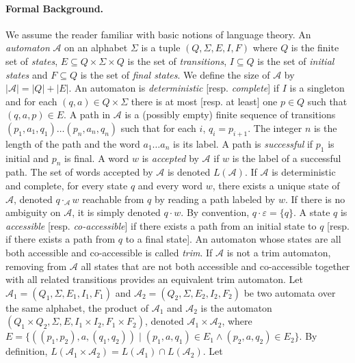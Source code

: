 \documentclass[]{llncs}
\def \A {\mathcal{A}}
\begin{document}
\paragraph*{Formal Background.}
We assume the reader familiar with basic notions of language theory.
An {\it automaton} $\A$ on an alphabet $\Sigma$ is a tuple
$(Q,\Sigma,E,I,F)$ where $Q$ is the finite set of {\it states}, $E\subseteq
Q\times \Sigma\times Q$ is the set of {\it transitions}, $I\subseteq Q$ is
the set of {\it initial states} and $F\subseteq Q$ is the set of {\it final
  states}. We define the size of $\A$ by $|\A| = |Q| + |E|$. An automaton is
{\it deterministic} [resp. {\it complete}] if $I$ is a singleton and for
each $(q,a)\in Q\times \Sigma$ there is at most [resp. at least] one $p\in
Q$ such that $(q,a,p)\in E$. A path in $\A$ is a (possibly empty) finite
sequence of transitions $(p_1,a_1,q_1)\ldots (p_n,a_n,q_n)$ such that for
each $i$, $q_i=p_{i+1}$. The integer $n$ is the length of the path and the
word $a_1\ldots a_n$ is its label. A path is {\it successful} if $p_1$ is
initial and $p_n$ is final. A word $w$ is {\it accepted} by $\A$ if $w$ is
the label of a successful path. The set of words accepted by $\A$ is denoted
$L(\A)$. If $\A$ is deterministic and complete, for every state $q$ and
every word $w$, there exists a unique state of $\A$, denoted $q\cdot_\A w$
reachable from $q$ by reading a path labeled by $w$. If there is no
ambiguity on $\A$, it is simply denoted $q\cdot w$. By convention, $q \cdot
\varepsilon=\{q\}$. A state $q$ is {\it accessible} [resp. {\it
    co-accessible}] if there exists a path from an initial state to $q$
                 [resp. if there exists a path from $q$ to a final state].
                 An automaton whose states are all both accessible and
                 co-accessible is called {\it trim}. If $\A$ is not a trim
                 automaton, removing from $\A$ all states that are not both
                 accessible and co-accessible together with all related
                 transitions provides an equivalent trim automaton. Let
                 $\A_1=(Q_1,\Sigma,E_1,I_1,F_1)$ and
                 $\A_2=(Q_2,\Sigma,E_2,I_2,F_2)$ be two automata over the
                 same alphabet, the product of $\A_1$ and $\A_2$ is the
                 automaton $(Q_1\times Q_2,\Sigma,E,I_1\times I_2,F_1\times
                 F_2)$, denoted $\A_1\times \A_2$, where
                 $E=\{((p_1,p_2),a,(q_1,q_2))\mid (p_1,a,q_1)\in E_1 \wedge
                 (p_2,a,q_2)\in E_2\}$. By definition, $L(\A_1\times
                 \A_2)=L(\A_1)\cap L(\A_2)$. Let
\end{document}
